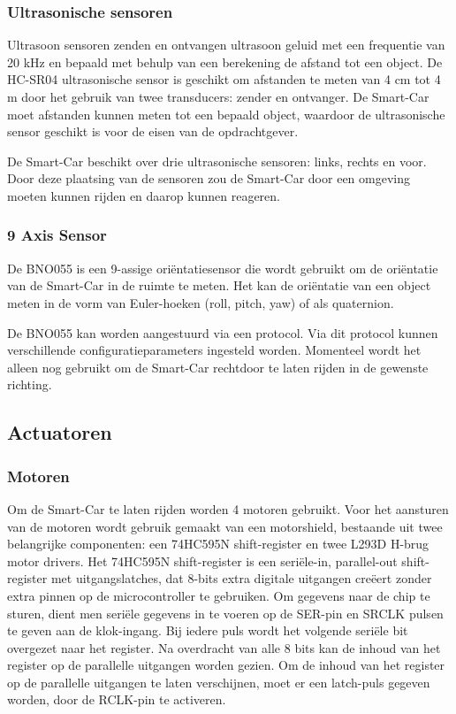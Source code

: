 \subsubsection{Ultrasonische sensoren}
Ultrasoon sensoren zenden en ontvangen ultrasoon geluid met een frequentie van 20 kHz en bepaald met behulp van een berekening de afstand tot een object. De HC-SR04 ultrasonische sensor is geschikt om afstanden te meten van 4 cm tot 4 m door het gebruik van twee \gls{transducer}s: zender en ontvanger. De \gls{Smart-Car} moet afstanden kunnen meten tot een bepaald object, waardoor de ultrasonische sensor geschikt is voor de eisen van de opdrachtgever\cite{HC-SR04}.

De \gls{Smart-Car} beschikt over drie ultrasonische sensoren: links, rechts en voor. Door deze plaatsing van de sensoren zou de \gls{Smart-Car} door een omgeving moeten kunnen rijden en daarop kunnen reageren. 

\subsubsection{9 Axis Sensor}
De BNO055\cite{AXIS} is een 9-assige oriëntatiesensor die wordt gebruikt om de oriëntatie van de \gls{Smart-Car} in de ruimte te meten. Het kan de oriëntatie van een object meten in de vorm van Euler-hoeken (roll, pitch, yaw) of als quaternion.

De BNO055\cite{AXIS} kan worden aangestuurd via een protocol. Via dit protocol kunnen verschillende configuratieparameters ingesteld worden. Momenteel wordt het alleen nog gebruikt om de \gls{Smart-Car} rechtdoor te laten rijden in de gewenste richting. 
\subsection{Actuatoren}
\subsubsection{Motoren}
Om de \gls{Smart-Car} te laten rijden worden 4 motoren gebruikt. Voor het aansturen van de motoren wordt gebruik gemaakt van een \gls{motorshield}, bestaande uit twee belangrijke componenten: een 74HC595N\cite{shiftregister} \gls{shift-register} en twee L293D\cite{h-brug} \gls{H-brug} motor drivers. Het 74HC595N\cite{shiftregister} \gls{shift-register} is een seriële-in, parallel-out \gls{shift-register} met uitgangslatches, dat 8-bits extra digitale uitgangen creëert zonder extra pinnen op de \gls{microcontroller} te gebruiken. Om gegevens naar de chip te sturen, dient men seriële gegevens in te voeren op de SER-pin en SRCLK pulsen te geven aan de klok-ingang. Bij iedere puls wordt het volgende seriële bit overgezet naar het \gls{register}. Na overdracht van alle 8 bits kan de inhoud van het \gls{register} op de parallelle uitgangen worden gezien. Om de inhoud van het \gls{register} op de parallelle uitgangen te laten verschijnen, moet er een latch-puls gegeven worden, door de RCLK-pin te activeren.

